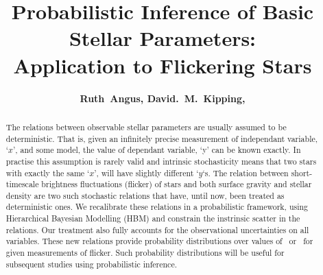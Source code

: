 \documentclass[apjl]{emulateapj}
\newcommand{\titledag}{$\dagger$}
\newcommand{\titledag}{\dagger}
\begin{document}
\title {Probabilistic Inference of Basic Stellar Parameters:\\
Application to Flickering Stars %
\altaffilmark{\titledag}}

\author{
	{\bf	Ruth~Angus,
		David.~M.~Kipping,
	}
}







\begin{abstract}

The relations between observable stellar parameters are usually assumed to be
deterministic.
That is, given an infinitely precise measurement of independant
variable, `$x$', and some model, the value of dependant variable, `y' can be
known exactly.
In practise this assumption is rarely valid and intrinsic stochasticity means
that two stars with exactly the same `$x$', will have slightly different
`$y$`s.
The relation between short-timescale brightness fluctuations (flicker) of stars
and both surface gravity \citep{bastien:2013} and stellar density
\citep{kipping:2014} are two such stochastic relations that have, until now,
been treated as deterministic ones.
We recalibrate these relations in a probabilistic framework, using
Hierarchical Bayesian Modelling (HBM) and constrain the instrinsic scatter in
the relations.
Our treatment also fully accounts for the observational uncertainties on all
variables.
These new relations provide probability distributions over values of \logg\
or \rhostar\ for given measurements of flicker.
Such probability distributions will be useful for subsequent studies using
probabilistic inference.

\end{abstract}

\end{document}

